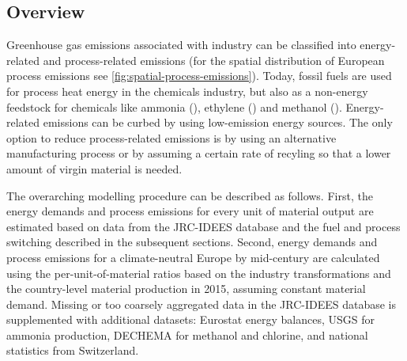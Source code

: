 \subsection{Overview}
\label{sec:si:industry:overview}

Greenhouse gas emissions associated with industry can be classified into
energy-related and process-related emissions (for the spatial distribution of
European process emissions see \cref{fig:spatial-process-emissions}). Today,
fossil fuels are used for process heat energy in the chemicals industry, but
also as a non-energy feedstock for chemicals like ammonia (), ethylene
() and methanol (). Energy-related emissions can be curbed by
using low-emission energy sources. The only option to reduce process-related
emissions is by using an alternative manufacturing process or by assuming a
certain rate of recyling so that a lower amount of virgin material is needed.

The overarching modelling procedure can be described as follows. First, the
energy demands and process emissions for every unit of material output are
estimated based on data from the JRC-IDEES
database
and the fuel and process switching described in the subsequent sections. Second,
energy demands and process emissions for a climate-neutral Europe by mid-century
are calculated using the per-unit-of-material ratios based on the industry
transformations and the country-level material production in
2015,
assuming constant material demand. Missing or too coarsely aggregated data in
the JRC-IDEES
database is
supplemented with additional datasets: Eurostat energy
balances, USGS for ammonia
production, DECHEMA for
methanol and chlorine, and national statistics from
Switzerland.

